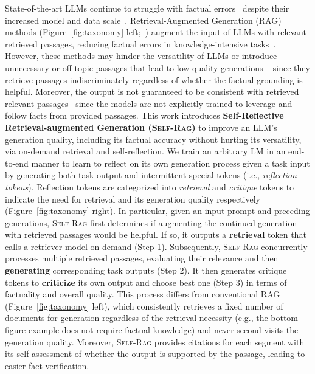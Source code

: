 \documentclass{article} %
\newcommand{\model}{\textsc{Self-Rag}\xspace}
\begin{document}
State-of-the-art LLMs continue to struggle with factual errors~\citep{mallen2022not,min2023factscore} despite their increased model and data scale~\citep{ouyang2022training}. 
Retrieval-Augmented Generation (RAG) methods (Figure~\ref{fig:taxonomy} left;~\citealt{lewis2020retrieval,guu2020retrieval}) augment the input of LLMs with relevant retrieved passages,  reducing factual errors in knowledge-intensive tasks~\citep{ram2023context, asai-etal-2023-retrieval}. 
However, these methods may hinder the versatility of LLMs or introduce unnecessary or off-topic passages that lead to low-quality generations ~\citep{pmlr-v202-shi23a} since they retrieve passages indiscriminately regardless of whether the factual grounding is helpful.
Moreover, the output is not guaranteed to be consistent with retrieved relevant passages~\citep{gao2023enabling} since the models are not explicitly trained to leverage and follow facts from provided passages. 
This work introduces {\bf Self-Reflective Retrieval-augmented Generation (\model)} to improve an LLM's generation quality, including its factual accuracy without hurting its versatility, via on-demand retrieval and self-reflection. 
We train an arbitrary LM in an end-to-end manner to learn to reflect on its own generation process given a task input by generating both task output and intermittent special tokens (i.e., \textit{reflection tokens}). Reflection tokens are categorized into \textit{retrieval} and \textit{critique} tokens to indicate the need for retrieval and its generation quality respectively (Figure~\ref{fig:taxonomy} right). 
{
In particular, given an input prompt and preceding generations, \model first determines if augmenting the continued generation with retrieved passages would be helpful. If so, 
it outputs a {\bf retrieval} token that calls a retriever model on demand (Step 1). 
Subsequently, \model concurrently processes multiple retrieved passages, evaluating their relevance and then {\bf generating} corresponding task outputs (Step 2). It then generates critique tokens to \textbf{criticize} its own output and choose best one (Step 3) in terms of factuality and overall quality. 
This process differs from conventional RAG (Figure~\ref{fig:taxonomy} left), which consistently retrieves a fixed number of documents for generation regardless of the retrieval necessity (e.g., the bottom figure example does not require factual knowledge) and never second visits the generation quality.
Moreover, \model provides citations for each segment with its self-assessment of whether the output is supported by the passage, leading to easier fact verification. }
\end{document}
